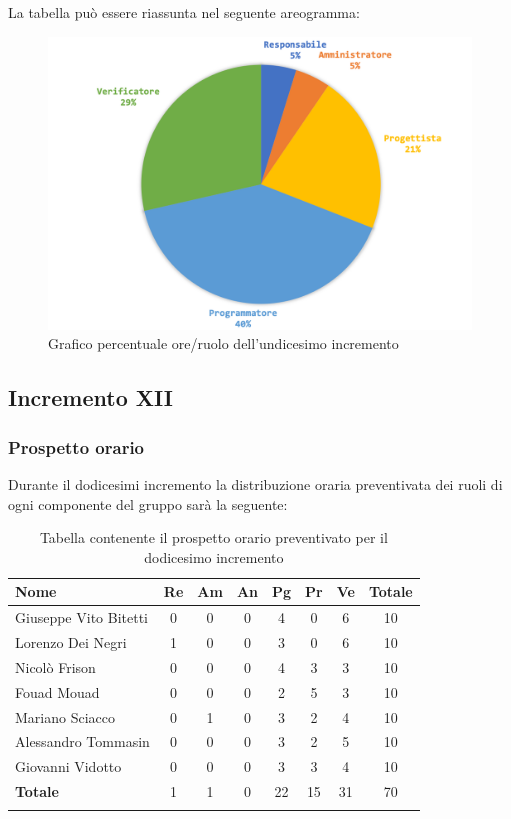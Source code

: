 		La tabella può essere riassunta nel seguente areogramma:
		\begin{figure}[H]
			\centering
			\includegraphics[width=0.8\linewidth]{./images/preventivo/incremento11-2.png}
			\caption{Grafico percentuale ore/ruolo dell'undicesimo incremento}
			\label{fig:grafico costi ruolo incremento XI }
		\end{figure}
		
		
		
	\subsection{Incremento XII}
		\subsubsection{Prospetto orario}
		Durante il dodicesimi incremento la distribuzione oraria preventivata dei ruoli di ogni componente del gruppo sarà la seguente:
		
		\begin{longtable}{|l|c|c|c|c|c|c|c|}
			\hline
			\rowcolor{lighter-grayer}
			\textbf{Nome} & \textbf{Re} & \textbf{Am} & \textbf{An} & \textbf{Pg}  & \textbf{Pr}   & \textbf{Ve} & \textbf{Totale} \\
			\hline
			\endfirsthead
			
			\hline
			Giuseppe Vito Bitetti 		 & 0 & 0 & 0 & 4 & 0 & 6 & 10\\
			\hline
			\hline
			Lorenzo Dei Negri			 & 1 & 0 & 0 & 3 & 0 & 6 & 10\\
			\hline
			\hline
			Nicolò Frison				      & 0 & 0 & 0 & 4 & 3 & 3 & 10\\
			\hline
			\hline
			Fouad Mouad 				   & 0 & 0 & 0 & 2 & 5 & 3 & 10\\
			\hline
			\hline
			Mariano Sciacco 			 & 0 & 1 & 0 & 3 & 2 & 4 & 10\\
			\hline
			\hline
			Alessandro Tommasin    & 0 & 0 & 0 & 3 & 2 & 5 & 10\\
			\hline
			\hline
			Giovanni Vidotto 			  & 0 & 0 & 0 & 3 & 3 & 4 & 10\\
			\hline 
			\textbf{Totale}			 		& 1 & 1 & 0 & 22 & 15 & 31 & 70\\
			\hline
			\caption{Tabella contenente il prospetto orario preventivato per il dodicesimo incremento}
		\end{longtable}
		\pagebreak
		
